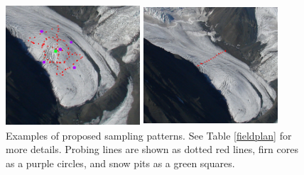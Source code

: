 \documentclass[12pt]{article}
\begin{document}
\begin{figure}
\begin{minipage}[c][11cm][t]{.33\textwidth}
\end{minipage}%
\begin{minipage}[c][11cm][t]{.33\textwidth}
	\vspace*{\fill}
  \centering
    \includegraphics[width=5cm,height=4.5cm]{probe_hourglass.jpeg}
   \par\vfill
   \includegraphics[width=5cm,height=4.5cm]{probe_transverse.jpeg}
\end{minipage}

\caption{Examples of proposed sampling patterns. See Table \ref{fieldplan} for more details. Probing lines are shown as dotted red lines, firn cores as a purple circles, and snow pits as a green squares.}
\label{glacier}
\end{figure}
\end{document}
